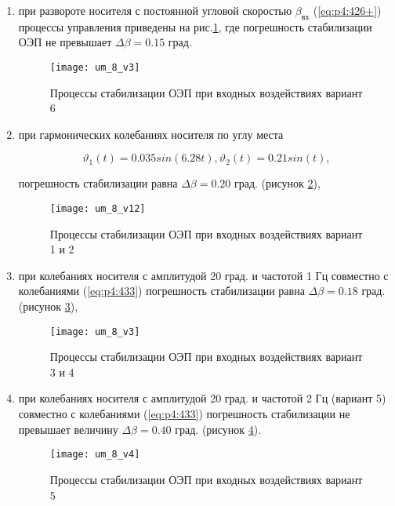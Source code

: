 \begin{enumerate}
	\item при развороте носителя с постоянной угловой скоростью $\beta_{\textit{вх}}$ (\ref{eq:p4:426+}) процессы управления приведены на рис.\ref{fig:um35}, где погрешность стабилизации ОЭП не превышает  $\varDelta \beta= 0.15$ град.
	
	\begin{figure}[ht]
		\centering
		\texttt{[image: um\_8\_v3]} 
		\caption{Процессы стабилизации ОЭП при входных воздействиях  вариант 6}
		\label{fig:um35}
	\end{figure}
	
	\item при гармонических колебаниях носителя по углу места
	
	\begin{equation}
	\label{eq:p4:433}
	\vartheta_{1}(t)=0.035sin(6.28t),\vartheta_{2}(t)=0.21sin(t),
	\end{equation}
	
	погрешность стабилизации равна  $\varDelta \beta= 0.20$ град. (рисунок \ref{fig:um36}),
	
	\begin{figure}[ht]
		\centering
		\texttt{[image: um\_8\_v12]} 
		\caption{Процессы стабилизации ОЭП при входных воздействиях  вариант 1 и 2}
		\label{fig:um36}
	\end{figure}
	
	\item при колебаниях носителя с амплитудой 20 град. и частотой 1 Гц  совместно с колебаниями (\ref{eq:p4:433}) погрешность стабилизации равна  $\varDelta \beta= 0.18$ град. (рисунок \ref{fig:um37}),
	
	\begin{figure}[ht]
		\centering
		\texttt{[image: um\_8\_v3]} 
		\caption{Процессы стабилизации ОЭП при входных воздействиях  вариант 3 и 4}
		\label{fig:um37}
	\end{figure}
	
	\item при  колебаниях носителя с амплитудой 20 град. и частотой 2  Гц (вариант 5) совместно с колебаниями (\ref{eq:p4:433}) погрешность стабилизации не превышает величину $\varDelta \beta= 0.40$ град. (рисунок \ref{fig:um38}).
	
	\begin{figure}[ht]
		\centering
		\texttt{[image: um\_8\_v4]} 
		\caption{Процессы стабилизации ОЭП при входных воздействиях  вариант 5}
		\label{fig:um38}
	\end{figure}
\end{enumerate}


